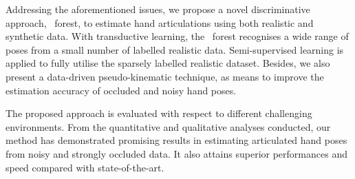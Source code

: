 Addressing the aforementioned issues, we propose a novel discriminative approach, \STR\ forest, to estimate hand articulations using both realistic and synthetic data. With transductive learning, the \STR\ forest recognises a wide range of poses from a small number of labelled realistic data. Semi-supervised learning is applied to fully utilise the sparsely labelled realistic dataset. Besides, we also present a data-driven pseudo-kinematic technique, as means to improve the estimation accuracy of occluded and noisy hand poses. 

The proposed approach is evaluated with respect to different challenging environments.    
From the quantitative and qualitative analyses conducted, our method has demonstrated promising results in estimating articulated hand poses from noisy and strongly occluded data.  
It also attains superior performances and speed compared with state-of-the-art.  
